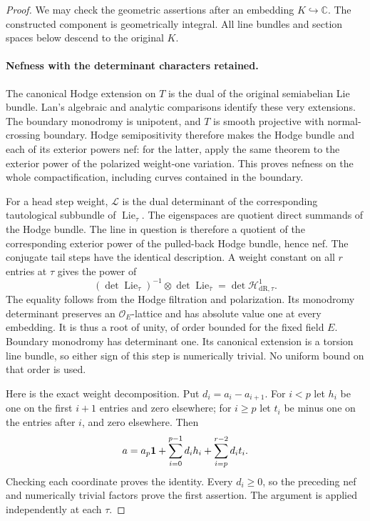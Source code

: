 \begin{proof}
We may check the geometric assertions after an embedding $K\hookrightarrow
\mathbb C$. The constructed component is geometrically integral.
All line bundles and section spaces below descend to the original $K$.

\paragraph{Nefness with the determinant characters retained.}
The canonical Hodge extension on $T$ is the dual of the original
semiabelian Lie bundle. Lan's algebraic and analytic comparisons
identify these very extensions\cite{positive-lan-kuga,positive-lan-analytic}.
The boundary monodromy is unipotent, and $T$ is smooth projective
with normal-crossing boundary. Hodge semipositivity therefore makes
the Hodge bundle and each of its exterior powers nef: for the latter,
apply the same theorem to the exterior power of the polarized
weight-one variation\cite{positive-fujino-fujisawa}.
This proves nefness on the whole compactification, including curves
contained in the boundary.

For a head step weight, $\mathcal L$ is the dual determinant of
the corresponding tautological subbundle of $\operatorname{Lie}_\tau$.
The eigenspaces are quotient direct summands of the Hodge bundle.
The line in question is therefore a quotient of the corresponding
exterior power of the pulled-back Hodge bundle, hence nef. The conjugate tail steps have
the identical description. A weight constant on all $r$ entries
at $\tau$ gives the power of
\[
 (\det\operatorname{Lie}_\tau)^{-1}
       \otimes\det\operatorname{Lie}_{\bar\tau}
       =\det\mathcal H^1_{\mathrm{dR},\tau}.
\]
The equality follows from the Hodge filtration and polarization.
Its monodromy determinant preserves an $\mathcal O_E$-lattice
and has absolute value one at every embedding. It is thus a root
of unity, of order bounded for the fixed field $E$. Boundary
monodromy has determinant one. Its canonical extension is a
torsion line bundle, so either sign of this step is numerically
trivial. No uniform bound on that order is used.

Here is the exact weight decomposition. Put
$d_i=a_i-a_{i+1}$. For $i<p$ let $h_i$ be one on the first
$i+1$ entries and zero elsewhere; for $i\ge p$ let $t_i$ be
minus one on the entries after $i$, and zero elsewhere. Then
\[
 a=a_p{\bf1}+\sum_{i=0}^{p-1}d_i h_i
+\sum_{i=p}^{r-2}d_i t_i.
\]
Checking each coordinate proves the identity. Every $d_i\ge0$,
so the preceding nef and numerically trivial factors prove the
first assertion. The argument is applied independently at each $\tau$.


\end{proof}
